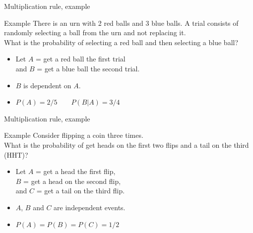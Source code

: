 \documentclass[xcolor=table, aspectratio=169, bigger, handout]{beamer}
\begin{document}
\begin{frame}{Multiplication rule, example}
\begin{exampleblock}{Example}
There is an urn with 2 red balls and 3 blue balls. A trial consists of randomly selecting a ball from the urn and not replacing it.\\
\medskip 
What is the probability of selecting a red ball and then selecting a blue ball?
\begin{itemize}
\pause
\item Let $A$ = get a red ball the first trial\\
 and $B$ = get a blue ball the second trial.\\

\pause
\item $B$ is dependent on $A$.\\ \smallskip
{} \smallskip

\pause
\item $P(A) = 2/5 \qquad P(B|A) = 3/4$\\ \smallskip

\pause
{}

\end{itemize}

\end{exampleblock}
\end{frame}

\begin{frame}{Multiplication rule, example}
\begin{exampleblock}{Example}
Consider flipping a coin three times.\\
\medskip 
What is the probability of get heads on the first two flips and a tail on the third (HHT)?
\begin{itemize}
\pause
\item Let $A$ = get a head the first flip,\\
 $B$ = get a head on the second flip,\\
and $C$ = get a tail on the third flip.

\pause
\item $A$, $B$ and $C$ are independent events.\\ \smallskip
{} \smallskip

\pause
\item $P(A) = P(B) = P(C) = 1/2$\\ \smallskip

\pause
{}

\end{itemize}

\end{exampleblock}
\end{frame}
\end{document}
